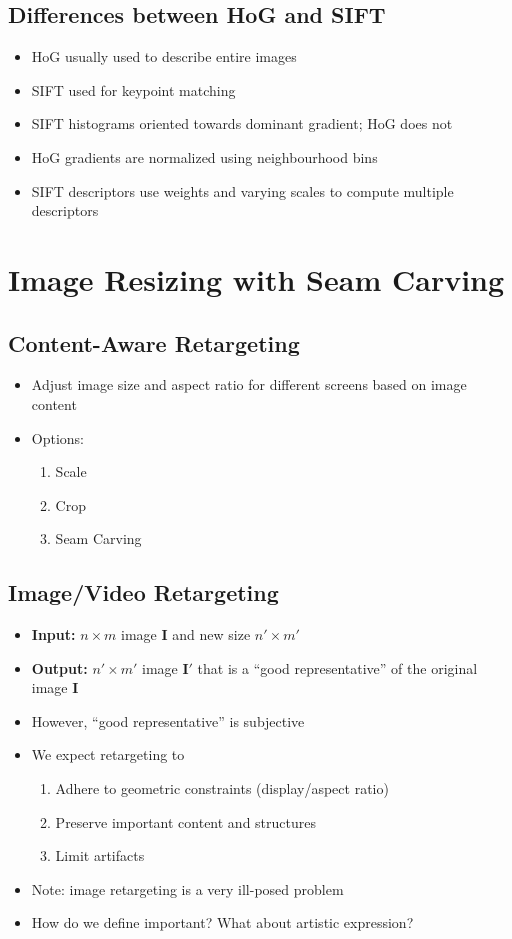\documentclass[letterpaper,12pt]{article}
\newcommand{\matr}[1]{\mathbf{#1}}
\begin{document}
\subsection{Differences between HoG and SIFT}
\begin{itemize}
 \item HoG usually used to describe entire images
 \item SIFT used for keypoint matching
 \item SIFT histograms oriented towards dominant gradient; HoG does not
 \item HoG gradients are normalized using neighbourhood bins
 \item SIFT descriptors use weights and varying scales to compute multiple descriptors
\end{itemize}

\section{Image Resizing with Seam Carving}

\subsection{Content-Aware Retargeting}
\begin{itemize}
 \item Adjust image size and aspect ratio for different screens based on image content
 \item Options:
       \begin{enumerate}
        \item Scale
        \item Crop
        \item Seam Carving
       \end{enumerate}
\end{itemize}

\subsection{Image/Video Retargeting}
\begin{itemize}
 \item \textbf{Input:} $n \times m$ image $\matr{I}$ and new size $n' \times m'$
 \item \textbf{Output:} $n' \times m'$ image $\matr{I}'$ that is a ``good representative'' of the original image $\matr{I}$
 \item However, ``good representative'' is subjective
 \item We expect retargeting to
       \begin{enumerate}
        \item Adhere to geometric constraints (display/aspect ratio)
        \item Preserve important content and structures
        \item Limit artifacts
       \end{enumerate}
 \item Note: image retargeting is a very ill-posed problem
 \item How do we define important? What about artistic expression?
\end{itemize}
\end{document}
